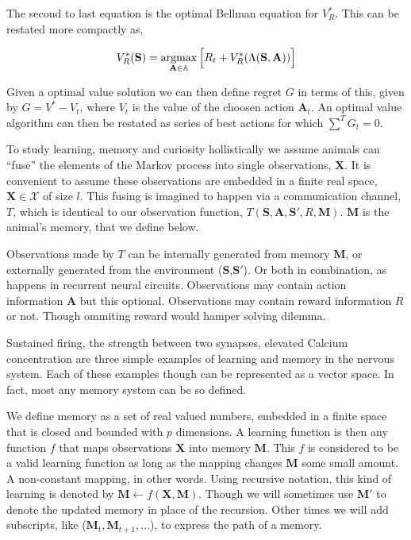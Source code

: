 The second to last equation is the optimal Bellman equation for $V^*_R$. This can be restated more compactly as,

\begin{equation} 
\label{eq:bellman_iter}
V^*_R(\mathbf{S}) = \operatorname*{argmax}_{\mathbf{A} \in \mathbb{A}} \Big [ R_{t}  + V^*_{R}(\Lambda(\mathbf{S},\mathbf{A})) \Big ]
\end{equation}

Given a optimal value solution we can then define regret $G$ in terms of this, given by $G = V^* - V_t$, where $V_t$ is the value of the choosen action $\mathbf{A}_t$. An optimal value algorithm can then be restated as series of best actions for which $\sum^T G_t = 0$.

To study learning, memory and curiosity hollistically we assume animals can ``fuse'' the elements of the Markov process into single observations, $\mathbf{X}$. It is convenient to assume these observations are embedded in a finite real space, $\mathbf{X} \in \mathcal{X}$ of size $l$. This fusing is imagined to happen via a communication channel, $T$, which is identical to our observation function, $T(\mathbf{S},\mathbf{A},\mathbf{S'},R,\mathbf{M})$. $\mathbf{M}$ is the animal's memory, that we define below. 

Observations made by $T$ can be internally generated from memory $\mathbf{M}$, or externally generated from the environment ($\mathbf{S}$,$\mathbf{S'}$). Or both in combination, as happens in recurrent neural circuits. Observations may contain action information $\mathbf{A}$ but this optional. Observations may contain reward information $R$ or not. Though ommiting reward would hamper solving dilemma.

Sustained firing, the strength between two synapses, elevated Calcium concentration are three simple examples of learning and memory in the nervous system. Each of these examples though can be represented as a vector space. In fact, most any memory system can be so defined. 

We define memory as a set of real valued numbers, embedded in a finite space that is closed and bounded with $p$ dimensions. A learning function is then any function $f$ that maps observations $\mathbf{X}$ into memory $\mathbf{M}$. This $f$ is considered to be a valid learning function as long as the mapping changes $\mathbf{M}$ some small amount. A non-constant mapping, in other words. Using recursive notation, this kind of learning is denoted by $\mathbf{M} \leftarrow f(\mathbf{X},\mathbf{M}) $. Though we will sometimes use $\mathbf{M'}$ to denote the updated memory in place of the recursion. Other times we will add subscripts, like ($\mathbf{M}_t,\mathbf{M}_{t+1},\ldots$), to express the path of a memory.


